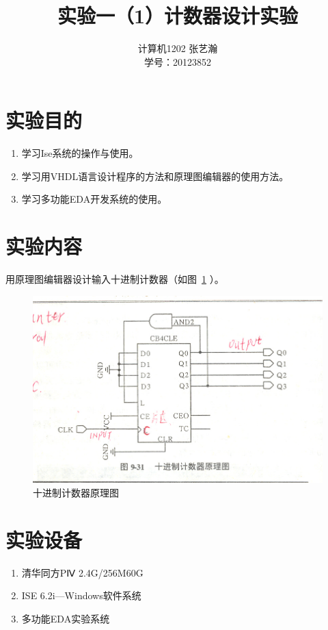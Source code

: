 \documentclass{article}
\begin{document}
\begin{CJK*}{UTF8}{gbsn}
\CJKtilde

\title{实验一（1）计数器设计实验}

\author{计算机1202 张艺瀚\\学号：20123852}
\maketitle

\section{实验目的}
\begin{enumerate}
\item 学习Ise系统的操作与使用。
\item 学习用VHDL语言设计程序的方法和原理图编辑器的使用方法。
\item 学习多功能EDA开发系统的使用。
\end{enumerate}

\section{实验内容}
用原理图编辑器设计输入十进制计数器（如图~\ref{fig: afig} ）。
\begin{center}
\begin{figure}[h!]
\includegraphics[width=\textwidth]{a.jpg}
\caption{十进制计数器原理图}
\label{fig: afig}
\end{figure}
\end{center}

\section{实验设备}
\begin{enumerate}
\item 清华同方PⅣ 2.4G/256M60G
\item ISE 6.2i—Windows软件系统
\item 多功能EDA实验系统
\end{enumerate}


\end{CJK*}
\end{document}
